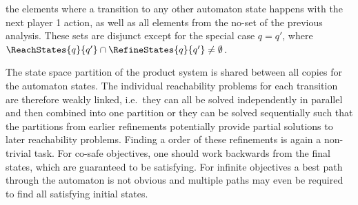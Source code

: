 the elements where a transition to any other automaton state happens with the next player 1 action, as well as all elements from the no-set of the previous analysis.
These sets are disjunct except for the special case $q = q'$, where $\ReachStates{q}{q'} \cap \RefineStates{q}{q'} \ne \emptyset$.

The state space partition of the product system is shared between all copies for the automaton states.
The individual reachability problems for each transition are therefore weakly linked, i.e.\ they can all be solved independently in parallel and then combined into one partition or they can be solved sequentially such that the partitions from earlier refinements potentially provide partial solutions to later reachability problems.
Finding a  order of these refinements is again a non-trivial task.
For co-safe objectives, one should work backwards from the final states, which are guaranteed to be satisfying.
For infinite objectives a best path through the automaton is not obvious and multiple paths may even be required to find all satisfying initial states.

